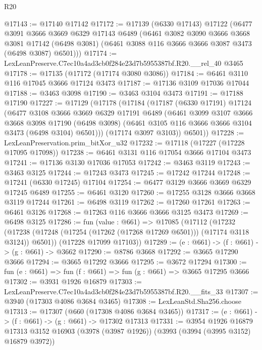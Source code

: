 \begin{lexlean}{R20}
\begin{coremodule}
@17143 := @17140 @17142
@17172 := @17139
    (@6330 @17143)
    @17122
    (@6477
      @3091
      @3666
      @3669
      @6329
      @17143
      @6489
      (@6461
        @3082
        @3090
        @3666
        @3668
        @3081
        @17142
        (@6498 @3081)
        (@6461 @3088 @116 @3666 @3666 @3087 @3473 (@6498 @3087) @6501)))
@17174 := LexLeanPreserve.C7ec10a4ad3cb0f284e23d7b5955387bf.R20.__rel_40 @3465
@17178 := @17135 (@17172 (@17174 @3080 @3086))
@17184 := @6461 @3110 @116 @17045 @3666 @17124 @3473
@17187 := @17136 @3109 @17036 @17044
@17188 := @3463 @3098
@17190 := @3463 @3104 @3473
@17191 := @17188 @17190
@17227 := @17129
    (@17178
      (@17184
        (@17187
          (@6330 @17191)
          @17124
          (@6477
            @3108
            @3666
            @3669
            @6329
            @17191
            @6489
            (@6461
              @3099
              @3107
              @3666
              @3668
              @3098
              @17190
              (@6498 @3098)
              (@6461 @3105 @116 @3666 @3666 @3104 @3473 (@6498 @3104) @6501)))
          (@17174 @3097 @3103))
        @6501))
@17228 := LexLeanPreservation.prim_bitXor_u32
@17232 := @17118 (@17227 (@17228 @17095 @17098))
@17238 := @6461 @3131 @116 @17054 @3666 @17104 @3473
@17241 := @17136 @3130 @17036 @17053
@17242 := @3463 @3119
@17243 := @3463 @3125
@17244 := @17243 @3473
@17245 := @17242 @17244
@17248 := @17241 (@6330 @17245) @17104
@17254 := @6477 @3129 @3666 @3669 @6329 @17245 @6489
@17255 := @6461 @3120
@17260 := @17255 @3128 @3666 @3668 @3119 @17244
@17261 := @6498 @3119
@17262 := @17260 @17261
@17263 := @6461 @3126
@17268 := @17263 @116 @3666 @3666 @3125 @3473
@17269 := @6498 @3125
@17286 := fun (value : @661) =>
  @17085
    (@17112
      (@17232 (@17238 (@17248 (@17254 (@17262 (@17268 @17269 @6501))) (@17174 @3118 @3124)) @6501))
      (@17228 @17099 @17103))
@17289 := (e : @661) -> (f : @661) -> (g : @661) -> @3662
@17290 := @8786 @3668
@17292 := @3665 @17290 @3666
@17294 := @3665 @17292 @3666
@17295 := @3672 @17294
@17300 := fun (e : @661) => fun (f : @661) => fun (g : @661) => @3665 @17295 @3666
@17302 := @3931 @1926 @16879
@17303 := LexLeanPreserve.C7ec10a4ad3cb0f284e23d7b5955387bf.R20.__fits_33
@17307 := @3940 (@17303 @4086 @3684 @3465)
@17308 := LexLeanStd.Sha256.choose
@17313 := @17307 (@660 (@17308 @4086 @3684 @3465))
@17317 := (e : @661) -> (f : @661) -> (g : @661) -> @17302 @17313
@17331 := @3954
    @1926
    @16879
    @17313
    @3152
    @16903
    (@3978 (@3987 @1926))
    (@3993 (@3994 (@3995 @3152) @16879 @3972))

\end{coremodule}
\end{lexlean}
